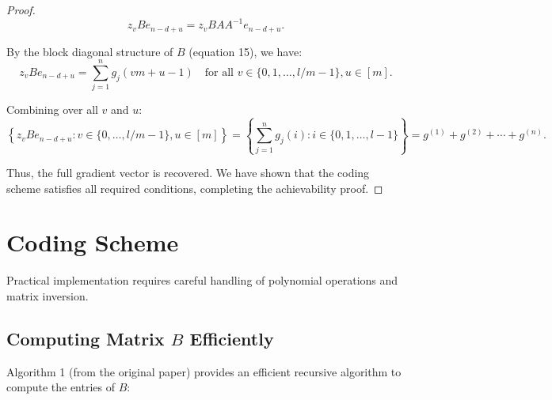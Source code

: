 \documentclass{report}
\theoremstyle{definition}
\begin{document}
\begin{proof}
    \begin{equation}
    z_v B e_{n-d+u} = z_v B A A^{-1} e_{n-d+u}.
    \end{equation}

    \noindent By the block diagonal structure of $B$ (equation 15), we have:
    \begin{equation}
    z_v B e_{n-d+u} = \sum_{j=1}^{n} g_j(vm + u - 1) \quad \text{for all } v \in \{0, 1, \ldots, l/m-1\}, u \in [m].
    \end{equation}

    \noindent Combining over all $v$ and $u$:
    \begin{equation}
    \left\{ z_v B e_{n-d+u} : v \in \{0, \ldots, l/m-1\}, u \in [m] \right\} = \left\{ \sum_{j=1}^n g_j(i) : i \in \{0, 1, \ldots, l-1\} \right\} = g^{(1)} + g^{(2)} + \cdots + g^{(n)}.
    \end{equation}

    \noindent Thus, the full gradient vector is recovered. We have shown that the coding scheme satisfies all required conditions, completing the achievability proof.

\end{proof}


\section{Coding Scheme}

Practical implementation requires careful handling of polynomial operations and matrix inversion.

\subsection{Computing Matrix $B$ Efficiently}

Algorithm 1 (from the original paper) provides an efficient recursive algorithm to compute the entries of $B$:
\end{document}
